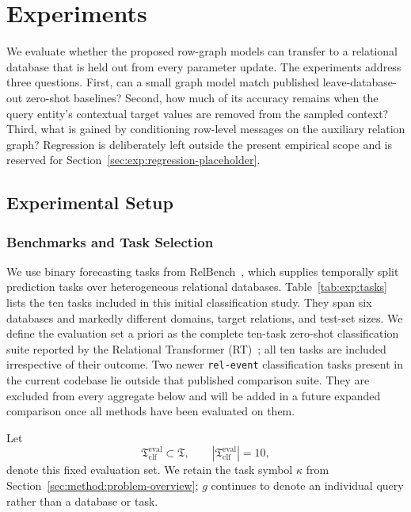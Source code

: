 \section{Experiments}
\label{sec:experiments}

We evaluate whether the proposed row-graph models can transfer to a
relational database that is held out from every parameter update. The
experiments address three questions. First, can a small
graph model match published leave-database-out zero-shot baselines?
Second, how much of its accuracy remains when the query entity's contextual
target values are removed from the sampled context? Third, what is gained by
conditioning row-level messages on the auxiliary relation graph? Regression
is deliberately left outside the present empirical scope and is reserved for
Section~\ref{sec:exp:regression-placeholder}.

\subsection{Experimental Setup}
\label{sec:exp:setup}

\subsubsection{Benchmarks and Task Selection}
\label{sec:exp:tasks}

We use binary forecasting tasks from RelBench~\citep{robinson2024relbench},
which supplies temporally split prediction tasks over heterogeneous
relational databases. Table~\ref{tab:exp:tasks} lists the ten tasks included
in this initial classification study. They span six databases and markedly
different domains, target relations, and test-set sizes. We define the
evaluation set a priori as the complete ten-task zero-shot classification
suite reported by the Relational Transformer (RT)~\citep{ranjan2026rt}; all
ten tasks are included irrespective of their outcome. Two newer
\texttt{rel-event} classification tasks present in the current codebase lie
outside that published comparison suite. They are excluded from every
aggregate below and will be added in a future expanded comparison once all
methods have been evaluated on them.

Let
\begin{equation}
  \mathfrak T_{\mathrm{clf}}^{\mathrm{eval}}
  \subset \mathfrak T,
  \qquad
  \left|\mathfrak T_{\mathrm{clf}}^{\mathrm{eval}}\right|=10,
\label{eq:exp:evaluation-task-set}
\end{equation}
denote this fixed evaluation set. We retain the task symbol \(\kappa\) from
Section~\ref{sec:method:problem-overview}; \(g\) continues to denote an
individual query rather than a database or task.

